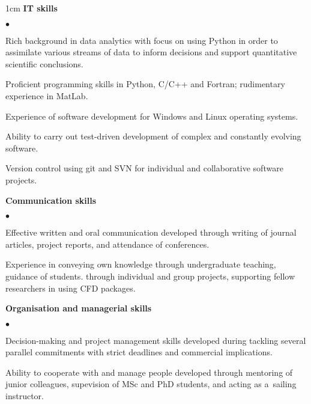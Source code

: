 \documentclass[a4paper,10pt]{article}
\newcommand{\squishlist}{
	\begin{list}{$\bullet$}
	{
		\setlength{\itemsep}{0pt}
		\setlength{\parsep}{0pt}
		\setlength{\topsep}{0pt}
		\setlength{\partopsep}{0pt}
		\setlength{\leftmargin}{2em}
		\setlength{\labelwidth}{1.5em}
		\setlength{\labelsep}{0.5em}
	}
}
\newcommand{\squishend}{\end{list}}
\begin{document}
\begin{minipage}{\textwidth}
\begin{adjustwidth}{}{1cm}
\textbf{IT skills}
\squishlist
	\item Rich background in data analytics with focus on using Python in order to assimilate various streams of
		data to inform decisions and support quantitative scientific conclusions.
	\item Proficient programming skills in Python, C/C++ and Fortran; rudimentary experience in MatLab.
	\item Experience of software development for Windows and Linux operating systems.
	\item Ability to carry out test-driven development of complex and constantly evolving software.
	\item Version control using git and SVN for individual and collaborative software projects.
\squishend

\textbf{Communication skills}
\squishlist
	\item Effective written and oral communication developed through writing of journal articles,
		project reports, and attendance of conferences.
	\item Experience in conveying own knowledge through undergraduate teaching, guidance of students.
		through individual and group projects, supporting fellow researchers in using CFD packages.
\squishend

\textbf{Organisation and managerial skills}
\squishlist
	\item Decision-making and project management skills developed during tackling several parallel commitments with strict deadlines and commercial implications.
	\item Ability to cooperate with and manage people developed through mentoring of junior colleagues, supevision of MSc and PhD students, and acting as a~sailing instructor.
\squishend

\end{adjustwidth}
\end{minipage}
\end{document}
